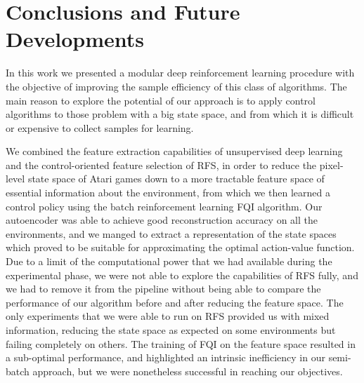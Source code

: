 \chapter{Conclusions and Future Developments}
\label{chapter7_conclusions}
\thispagestyle{empty}

\vspace{0.5cm}

In this work we presented a modular deep reinforcement learning procedure 
with the objective of improving the sample efficiency of this class of 
algorithms.
The main reason to explore the potential of our approach is to apply control
algorithms to those problem with a big state space, and from which it is 
difficult or expensive to collect samples for learning. 

We combined the feature extraction capabilities of unsupervised deep learning 
and the control-oriented feature selection of RFS, in order to reduce the 
pixel-level state space of Atari games down to a more tractable feature space of 
essential information about the environment, from which we then learned a 
control policy using the batch reinforcement learning FQI algorithm.
Our autoencoder was able to achieve good reconstruction accuracy on all the
environments, and we manged to extract a representation of the state spaces
which proved to be suitable for approximating the optimal action-value function.
Due to a limit of the computational power that we had available during the 
experimental phase, we were not able to explore the capabilities of RFS fully, 
and we had to remove it from the pipeline without being able to compare the 
performance of our algorithm before and after reducing the feature space. 
The only experiments that we were able to run on RFS provided us with mixed
information, reducing the state space as expected on some environments but 
failing completely on others. 
The training of FQI on the feature space resulted in a sub-optimal
performance, and highlighted an intrinsic inefficiency in our semi-batch 
approach, but we were nonetheless successful in reaching our objectives.

